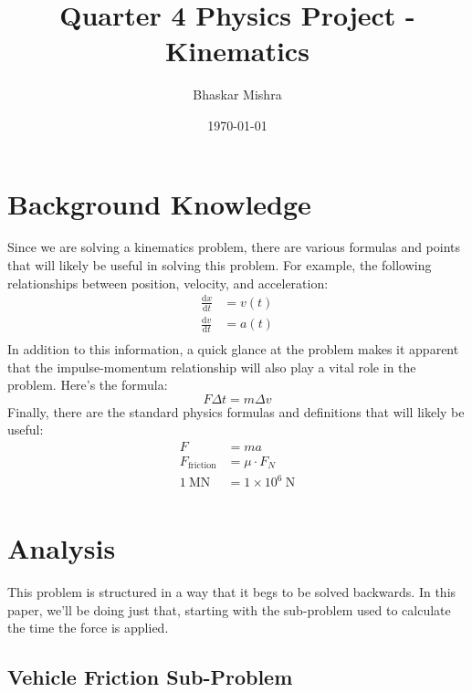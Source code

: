 \documentclass[10pt,letterpaper]{article}
\title{Quarter 4 Physics Project - Kinematics}
\date{\today}
\author{Bhaskar Mishra}
\begin{document}
    \maketitle
    \newpage
    \tableofcontents
    \newpage
    
    \section{Background Knowledge}
    
    Since we are solving a kinematics problem, there are various formulas and points that will likely be useful in solving this problem. For example, the following relationships between position, velocity, and acceleration:
    \begin{align*}
    	\frac{\textrm{d}x}{\textrm{d}t}&=v(t)\\
       	\frac{\textrm{d}v}{\textrm{d}t}&=a(t)\\
    \end{align*}
    In addition to this information, a quick glance at the problem makes it apparent that the impulse-momentum relationship will also play a vital role in the problem. Here's the formula:
    \begin{equation*}
    	F\Delta t = m\Delta v
    \end{equation*}
    Finally, there are the standard physics formulas and definitions that will likely be useful:
    \begin{align*}
    	F&=ma\\
    	F_{\textrm{friction}}&=\mu \cdot F_N\\
    	1\:\textrm{MN} &= 1\times 10^6\: \textrm{N}\\
    \end{align*}
    
   	\section{Analysis}
   	
   	This problem is structured in a way that it begs to be solved backwards. In this paper, we'll be doing just that, starting with the sub-problem used to calculate the time the force is applied.
   	
   	\subsection{Vehicle Friction Sub-Problem}
   	
\end{document}
